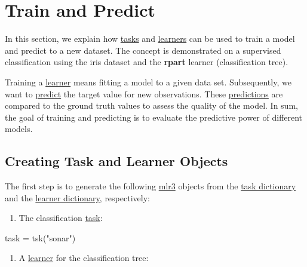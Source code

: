 \documentclass[
  11pt,
  parskip=half,
  DIV=calc,
  BCOR=10mm,
  x11names]{scrbook}
\newenvironment{Shaded}{}{}
\newcommand{\KeywordTok}[1]{\textcolor[rgb]{0.00,0.00,1.00}{#1}}
\newcommand{\NormalTok}[1]{#1}
\newcommand{\StringTok}[1]{\textcolor[rgb]{0.00,0.50,0.50}{#1}}
\providecommand{\tightlist}{%
  \setlength{\itemsep}{0pt}\setlength{\parskip}{0pt}}
\begin{document}
\hypertarget{train-predict}{%
\section{Train and Predict}\label{train-predict}}

In this section, we explain how \protect\hyperlink{tasks}{tasks} and \protect\hyperlink{learners}{learners} can be used to train a model and predict to a new dataset.
The concept is demonstrated on a supervised classification using the iris dataset and the \textbf{rpart} learner (classification tree).

Training a \protect\hyperlink{learners}{learner} means fitting a model to a given data set.
Subsequently, we want to \protect\hyperlink{predicting}{predict} the target value for new observations.
These \protect\hyperlink{predicting}{predictions} are compared to the ground truth values to assess the quality of the model.
In sum, the goal of training and predicting is to evaluate the predictive power of different models.

\hypertarget{train-predict-objects}{%
\subsection{Creating Task and Learner Objects}\label{train-predict-objects}}

The first step is to generate the following \href{https://mlr3.mlr-org.com}{mlr3} objects from the \protect\hyperlink{tasks}{task dictionary} and the \protect\hyperlink{learners}{learner dictionary}, respectively:

\begin{enumerate}
\def\labelenumi{\arabic{enumi}.}
\tightlist
\item
  The classification \protect\hyperlink{tasks}{task}:
\end{enumerate}

\begin{Shaded}
\begin{Highlighting}[]
\NormalTok{task =}\StringTok{ }\KeywordTok{tsk}\NormalTok{(}\StringTok{"sonar"}\NormalTok{)}
\end{Highlighting}
\end{Shaded}

\begin{enumerate}
\def\labelenumi{\arabic{enumi}.}
\setcounter{enumi}{1}
\tightlist
\item
  A \protect\hyperlink{learners}{learner} for the classification tree:
\end{enumerate}
\end{document}
